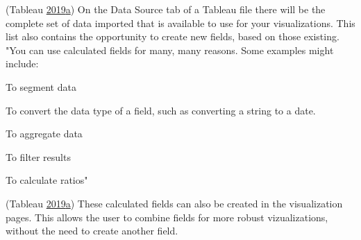 \documentclass[]{book}
\begin{document}
(Tableau \protect\hyperlink{ref-Tableau_Calculated_Fields}{2019}\protect\hyperlink{ref-Tableau_Calculated_Fields}{a})
On the Data Source tab of a Tableau file there will be the complete set of data imported that is available to use for your visualizations. This list also contains the opportunity to create new fields, based on those existing.
"You can use calculated fields for many, many reasons.
Some examples might include:

To segment data

To convert the data type of a field, such as converting a string to a date.

To aggregate data

To filter results

To calculate ratios"

(Tableau \protect\hyperlink{ref-Tableau_Calculated_Fields}{2019}\protect\hyperlink{ref-Tableau_Calculated_Fields}{a})
These calculated fields can also be created in the visualization pages. This allows the user to combine fields for more robust vizualizations, without the need to create another field.
\end{document}
